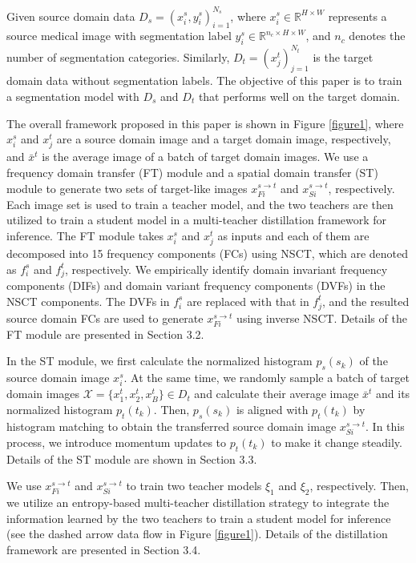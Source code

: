 \documentclass[letterpaper]{article} %
\begin{document}
Given source domain data $D_s={(x_i^s,y_i^s)}_{i=1}^{N_s}$, where $x_i^s\in{\mathbb{R} ^{H\times{W}}}$ represents a source medical image with segmentation label
 $y_i^s\in{\mathbb{R}^{{n_c}\times{H}\times{W}}}$, and $n_c$ denotes the number of segmentation categories. Similarly, $D_t={(x_j^t)}_{j=1}^{N_t}$ is the target domain data
without segmentation labels. The objective of this paper is to train a segmentation model with $D_s$ and $D_t$ that performs well on the target domain.

The overall framework proposed in this paper is shown in Figure \ref{figure1}, where $x_i^s$ and $x_j^t$ are a source domain image and a target domain image,
respectively, and $\bar{x}^t$ is the average image of a batch of target domain images. We use a frequency domain transfer (FT) module and a spatial
domain transfer (ST) module to generate two sets of target-like images $x_{Fi}^{s\to{t}}$ and $x_{Si}^{s\to{t}}$, respectively. Each image set is used
to train a teacher model, and the two teachers are then utilized to train a student model in a
multi-teacher distillation framework for inference. The FT module takes $x_i^s$ and $x_j^t$ as inputs and each of them are decomposed into 15 frequency components
(FCs) using NSCT, which are denoted as $f_i^s$ and $f_j^t$, respectively. We empirically identify domain invariant frequency components (DIFs) and
domain variant frequency components (DVFs) in the NSCT components. The DVFs in $f_i^s$ are replaced with that in $f_j^t$, and the resulted source domain FCs are used
to generate $x_{Fi}^{s\to{t}}$ using inverse NSCT. Details of the FT module are presented in Section 3.2.

In the ST module, we first calculate the normalized histogram $p_s(s_k)$ of the source domain image $x_i^s$. At the same time, we
randomly sample a batch of target domain images $\mathcal{X}  =\{x_1^t,x_2^t,x_B^t\}\in{D_t}$ and calculate their average image $\bar{x}^t$ and its normalized histogram $p_t(t_k)$.
Then, $p_s(s_k)$ is aligned with $p_t(t_k)$ by histogram matching to obtain the transferred source domain image $x_{Si}^{s\to{t}}$. In this process,
we introduce momentum updates to $p_t(t_k)$ to make it change steadily. Details of the ST module are shown in Section 3.3.

We use $x_{Fi}^{s\to{t}}$ and $x_{Si}^{s\to{t}}$ to train two teacher models
$\xi_1$ and $\xi_2$, respectively. Then, we utilize  an entropy-based multi-teacher distillation strategy \cite{34} to integrate the information
learned by the two teachers to train a student model for inference (see the dashed arrow data flow in Figure \ref{figure1}). Details of the distillation framework are
presented in Section 3.4.
\end{document}
